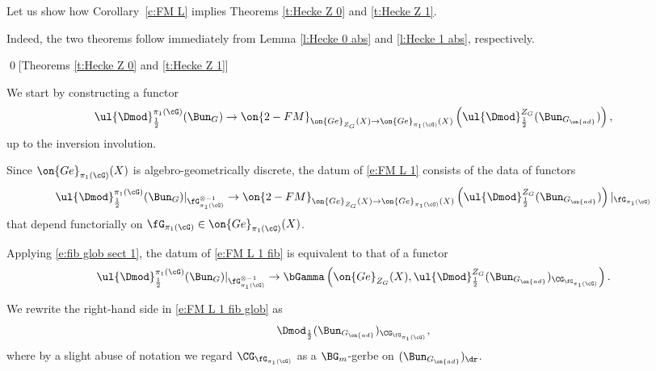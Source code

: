 \documentclass[9pt]{amsart}
\theoremstyle{remark}
\theoremstyle{definition}
\theoremstyle{remark}
\newcommand{\thmref}[1]{Theorem~\ref{#1}}
\newcommand{\corref}[1]{Corollary~\ref{#1}}
\numberwithin{equation}{section}
\begin{document}
\sssec{} \label{sss:proof central Hecke}

Let us show how \corref{c:FM L} implies Theorems \ref{t:Hecke Z 0} and  \ref{t:Hecke Z 1}. 

\medskip

Indeed, the two theorems follow immediately from Lemma \ref{l:Hecke 0 abs} and \ref{l:Hecke 1 abs}, respectively. 

\qed[Theorems \ref{t:Hecke Z 0} and  \ref{t:Hecke Z 1}]


\ssec{Proof of \thmref{t:FM L}}

\sssec{}

We start by constructing a functor 
\begin{equation} \label{e:FM L 1}
\ul{\Dmod}^{\pi_1(\cG)}_{\frac{1}{2}}(\Bun_G)\to \on{2-FM}_{\on{Ge}_{Z_G}(X)\to \on{Ge}_{\pi_1(\cG)}(X)}\left(\ul{\Dmod}^{Z_G}_{\frac{1}{2}}(\Bun_{G_{\on{ad}}})\right),
\end{equation}
up to the inversion involution.

\medskip

Since $\on{Ge}_{\pi_1(\cG)}(X)$ is algebro-geometrically discrete, the datum of \eqref{e:FM L 1} consists of the data of functors 
\begin{equation} \label{e:FM L 1 fib}
\ul{\Dmod}^{\pi_1(\cG)}_{\frac{1}{2}}(\Bun_G)|_{\fG^{\otimes -1}_{\pi_1(\cG)}}
\to \on{2-FM}_{\on{Ge}_{Z_G}(X)\to \on{Ge}_{\pi_1(\cG)}(X)}\left(\ul{\Dmod}^{Z_G}_{\frac{1}{2}}(\Bun_{G_{\on{ad}}})\right)|_{\fG_{\pi_1(\cG)}}
\end{equation}
that depend functorially on $\fG_{\pi_1(\cG)}\in \on{Ge}_{\pi_1(\cG)}(X)$. 

\medskip

Applying \eqref{e:fib glob sect 1}, the datum of \eqref{e:FM L 1 fib} is equivalent to that of a functor
\begin{equation} \label{e:FM L 1 fib glob}
\ul{\Dmod}^{\pi_1(\cG)}_{\frac{1}{2}}(\Bun_G)|_{\fG^{\otimes -1}_{\pi_1(\cG)}}\to 
\bGamma\left(\on{Ge}_{Z_G}(X),\ul{\Dmod}^{Z_G}_{\frac{1}{2}}(\Bun_{G_{\on{ad}}})_{\CG_{\fG_{\pi_1(\cG)}}}\right).
\end{equation}

We rewrite the right-hand side in \eqref{e:FM L 1 fib glob} as
\begin{equation} \label{e:FM L 1 fib glob RHS}
\Dmod_{\frac{1}{2}}(\Bun_{G_{\on{ad}}})_{\CG_{\fG_{\pi_1(\cG)}}},
\end{equation} 
where by a slight abuse of notation we regard $\CG_{\fG_{\pi_1(\cG)}}$ as a $\BG_m$-gerbe on $(\Bun_{G_{\on{ad}}})_\dr$. 
\end{document}
